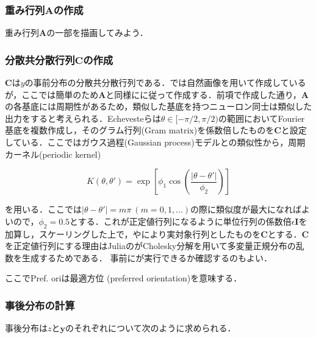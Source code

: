 \subsubsection{重み行列$\mathbf{A}$の作成}




重み行列$\mathbf{A}$の一部を描画してみよう．


\subsubsection{分散共分散行列$\mathbf{C}$の作成}
$\mathbf{C}$は$y$の事前分布の分散共分散行列である．\citep{Orban2016-tm}では自然画像を用いて作成しているが，ここでは簡単のため$\mathbf{A}$と同様に\citep{Echeveste2020-sh}に従って作成する．前項で作成した通り，$\mathbf{A}$の各基底には周期性があるため，類似した基底を持つニューロン同士は類似した出力をすると考えられる．Echevesteらは$\theta\in[-\pi/2, \pi/2)$の範囲においてFourier基底を複数作成し，そのグラム行列(Gram matrix)を係数倍したものを$\mathbf{C}$と設定している．ここではガウス過程(Gaussian process)モデルとの類似性から，周期カーネル(periodic kernel) 


\begin{equation}
K(\theta, \theta')=\exp\left[\phi_1 \cos \left(\dfrac{|\theta-\theta'|}{\phi_2}\right)\right]
\end{equation}


を用いる．ここでは$|\theta-\theta'|=m\pi\ (m=0,1,\ldots)$の際に類似度が最大になればよいので，$\phi_2=0.5$とする．これが正定値行列になるように単位行列の係数倍$\epsilon\mathbf{I}$を加算し，スケーリングした上で，やにより実対象行列としたものを$\mathbf{C}$とする．$\mathbf{C}$を正定値行列にする理由はJuliaのがCholesky分解を用いて多変量正規分布の乱数を生成するためである． 事前にが実行できるか確認するのもよい．



ここでPref. oriは最適方位 (preferred orientation)を意味する．
\subsubsection{事後分布の計算}
事後分布は$z$と$\mathbf{y}$のそれぞれについて次のように求められる．



